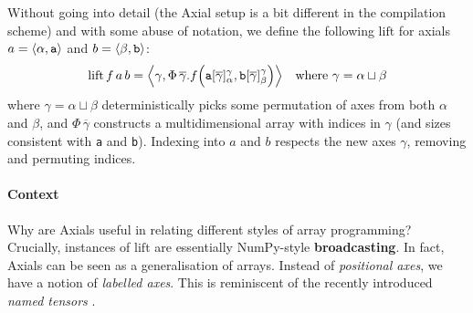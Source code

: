 Without going into detail (the Axial setup is a bit different in the compilation scheme) and with some abuse of notation, we define the following $\mathrm{lift}$ for axials $a = \phipair{\alpha}{\texttt{a}}$ and $b = \phipair{\beta}{\texttt{b}}$:
$$ 
\mathrm{lift}\,f\,a\,b = \phipair{\gamma}{\Phi\,\overline{\gamma}. 
f \left( \texttt{a}[\overline{\gamma}]_\alpha^\gamma, \texttt{b}[\overline{\gamma}]_\beta^\gamma \right) } \quad \text{where } \gamma = \alpha \sqcup \beta
$$
where $\gamma = \alpha \sqcup \beta$ deterministically picks some permutation of axes from both $\alpha$ and $\beta$, and $\Phi\,\overline{\gamma}$ constructs a multidimensional array with indices in $\gamma$ (and sizes consistent with \texttt{a} and \texttt{b}). 
Indexing into $a$ and $b$ respects the new axes $\gamma$, removing and permuting indices.



\paragraph{Context} Why are Axials useful in relating different styles of array programming? Crucially, instances of $\mathrm{lift}$ are essentially NumPy-style \textbf{broadcasting}.
In fact, Axials can be seen as a generalisation of arrays. 
Instead of \textit{positional axes}, we have a notion of \textit{labelled axes}. 
This is reminiscent of the recently introduced \textit{named tensors} \cite{chiang2022named}. 

